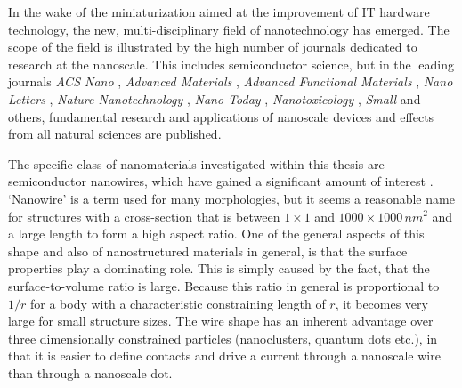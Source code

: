 In the wake of the miniaturization aimed at the improvement of IT hardware technology, the new, multi-disciplinary field of nanotechnology has emerged. The scope of the field is illustrated by the high number of journals dedicated to research at the nanoscale. This includes semiconductor science, but in the leading journals \emph{ACS Nano} \cite{acs_nano_http://pubs.acs.org/journal/ancac3_2015}, \emph{Advanced Materials} \cite{advanced_materials_http://www.advmat./_2015}, \emph{Advanced Functional Materials} \cite{advanced_functional_materials_http://onlinelibrary.wiley.com/journal/10.1002/issn1616-3028_2015}, \emph{Nano Letters} \cite{nano_letters_http://pubs.acs.org/journal/nalefd_2015}, \emph{Nature Nanotechnology} \cite{nature_nanotechnology_http://www.nature.com/nnano_2015}, \emph{Nano Today} \cite{nano_today_http://journals.elsevier.com/17480132/nano-today/_2015}, \emph{Nanotoxicology} \cite{nanotoxicology_http://www.informahealthcare.com/nan_2015}, \emph{Small} \cite{small_http://www.small-journal.com/_2015} and others, fundamental research and applications of nanoscale devices and effects from all natural sciences are published.

The specific class of nanomaterials investigated within this thesis are semiconductor nanowires, which have gained a significant amount of  interest \cite{huang_room-temperature_2001,cui_nanowire_2001,duan_indium_2001,xia_one-dimensional_2003,lieber_functional_2007}. `Nanowire' is a term used for many morphologies, but it seems a reasonable name for structures with a cross-section that is between $1 \times 1$ and $1000 \times 1000\,nm^2$ and a large length to form a high aspect ratio. One of the general aspects of this shape and also of nanostructured materials in general, is that the surface properties play a dominating role. This is simply caused by the fact, that the surface-to-volume ratio is large. Because this ratio in general is proportional to $1/r$ for a body with a characteristic constraining length of $r$, it becomes very large for small structure sizes. The wire shape has an inherent advantage over three dimensionally constrained particles (nanoclusters, quantum dots etc.), in that it is easier to define contacts and drive a current through a nanoscale wire than through a nanoscale dot. 


